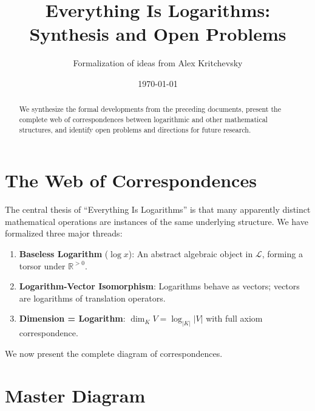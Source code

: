\documentclass[11pt]{article}
\title{Everything Is Logarithms: Synthesis and Open Problems}
\author{Formalization of ideas from Alex Kritchevsky}
\date{\today}
\begin{document}
\maketitle

\begin{abstract}
We synthesize the formal developments from the preceding documents, present the complete web of correspondences between logarithmic and other mathematical structures, and identify open problems and directions for future research.
\end{abstract}

\tableofcontents
\newpage

\section{The Web of Correspondences}
\label{sec:web}

The central thesis of ``Everything Is Logarithms'' is that many apparently distinct mathematical operations are instances of the same underlying structure. We have formalized three major threads:

\begin{enumerate}
\item \textbf{Baseless Logarithm} ($\log x$): An abstract algebraic object in $\mathcal{L}$, forming a torsor under $\mathbb{R}^{>0}$.
\item \textbf{Logarithm-Vector Isomorphism}: Logarithms behave as vectors; vectors are logarithms of translation operators.
\item \textbf{Dimension = Logarithm}: $\dim_K V = \log_{|K|} |V|$ with full axiom correspondence.
\end{enumerate}

We now present the complete diagram of correspondences.

\section{Master Diagram}
\label{sec:diagram}
\end{document}
